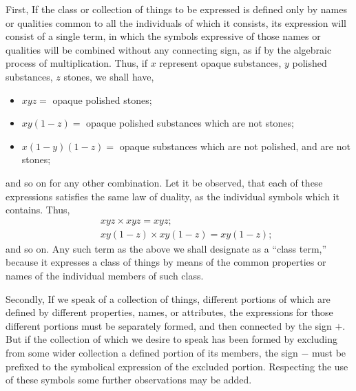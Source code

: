 \documentclass[oneside]{book}
\begin{document}
First, If the class or collection of things to be expressed is
defined only by names or qualities common to all the individuals
of which it consists, its expression will consist of a single term,
in which the symbols expressive of those names or qualities will
be combined without any connecting sign, as if by the algebraic
process of multiplication. Thus, if $x$ represent opaque
substances, $y$ polished substances, $z$ stones, we shall have,

\begin{itemize}
\item[] $xyz = $ opaque polished stones;
\item[] $xy (1 - z) = $ opaque polished substances which are not stones;
\item[] $x (1 - y)(1 - z) = $ opaque substances which are not polished,
and are not stones;
\end{itemize}

and so on for any other combination. Let it be observed, that
each of these expressions satisfies the same law of duality, as the
individual symbols which it contains. Thus,
\begin{eqnarray*}
&&xyz \times xyz = xyz;\\
&&xy (1 - z) \times xy (1 - z) = xy (1 - z);
\end{eqnarray*}
and so on. Any such term as the above we shall designate as
a ``class term,'' because it expresses a class of things by means
of the common properties or names of the individual members of
such class.

Secondly, If we speak of a collection of things, different
portions of which are defined by different properties, names, or
attributes, the expressions for those different portions must be
separately formed, and then connected by the sign $+$. But if
the collection of which we desire to speak has been formed by
excluding from some wider collection a defined portion of its
members, the sign $-$ must be prefixed to the symbolical expression
of the excluded portion. Respecting the use of these symbols
some further observations may be added.
\end{document}
